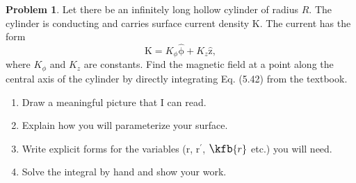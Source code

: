 \documentclass[10pt]{article}
\theoremstyle{definition}
\newtheorem{problem}{Problem}
\newcommand{\uv}[1]{\hat{\bv{{#1}}}}
\newcommand{\pr}[1]{{#1^\prime}}
\newcommand{\bscriptr}{\fontsize{12pt}{12pt}\kfb{r}}
\newcommand{\bv}[1]{\bm{\mathrm{#1}}}
\begin{document}
\begin{problem}
Let there be an infinitely long hollow cylinder of radius $R$. The cylinder is conducting and carries surface current
density $\bv{K}$. The current has the form
$$\bv{K}=K_\phi\uv{\phi}+K_z\uv{z},$$
where $K_\phi$ and $K_z$ are constants. Find the magnetic field at a point along the central axis of the cylinder by
directly integrating Eq. (5.42) from the textbook.
\begin{enumerate}[label=(\alph*)]
  \item Draw a meaningful picture that I can read.
  \item Explain how you will parameterize your surface.
  \item Write explicit forms for the variables ($\bv{r}$, $\pr{\bv{r}}$, $\bscriptr$ etc.) you will need.
  \item Solve the integral by hand and show your work.
\end{enumerate}
\end{problem}
\end{document}
